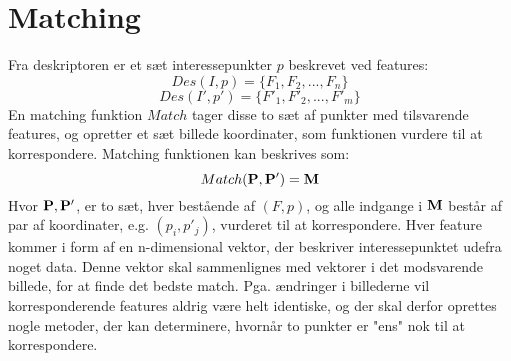 \section{Matching}
Fra deskriptoren er et sæt interessepunkter $p$ beskrevet ved features:
$$ Des(I,p)= \lbrace F_1,F_2,...,F_n \rbrace $$
$$ Des(I',p')=\lbrace F'_1,F'_2,...,F'_m \rbrace $$
En matching funktion $Match$  tager disse to sæt af punkter med tilsvarende features, og opretter et sæt billede koordinater, som funktionen vurdere til at korrespondere. Matching funktionen kan beskrives som:
\begin{equation}
Match(\bold{P}, \bold{P}') = \bold{M}
\end{equation}
Hvor $\bold{P}, \bold{P}'$, er to sæt, hver bestående af $(F, p)$, og alle indgange i $\bold{M}$ består af par af koordinater, e.g. $(p_i, p'_j)$, vurderet til at korrespondere.
Hver feature kommer i form af en n-dimensional vektor, der beskriver interessepunktet udefra noget data. Denne vektor skal sammenlignes med vektorer i det modsvarende billede, for at finde det bedste match. Pga. ændringer i billederne vil korresponderende features aldrig være helt identiske, og der skal derfor oprettes nogle metoder, der kan determinere, hvornår to punkter er "ens" nok til at korrespondere.